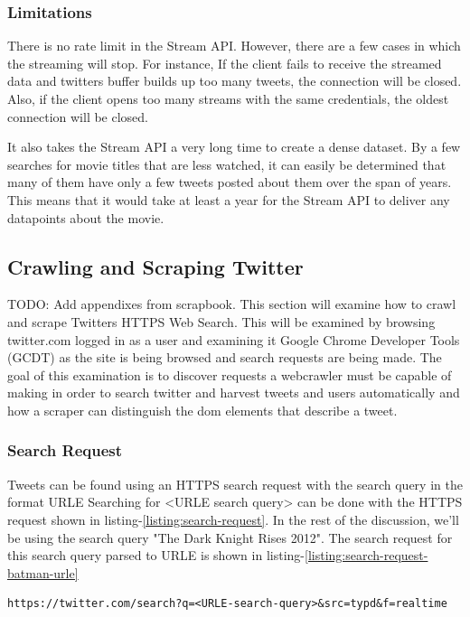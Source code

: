 \subsubsection{Limitations}
There is no rate limit in the Stream API. However, there are a few cases in which the streaming will stop. For instance, If the client fails to receive the streamed data and twitters buffer builds up too many tweets, the connection will be closed. Also, if the client opens too many streams with the same credentials, the oldest connection will be closed.

It also takes the Stream API a very long time to create a dense dataset. By a few searches for movie titles that are less watched, it can easily be determined that many of them have only a few tweets posted about them over the span of years. This means that it would take at least a year for the Stream API to deliver any datapoints about the movie.

\subsection{Crawling and Scraping Twitter}
TODO: Add appendixes from scrapbook.
This section will examine how to crawl and scrape Twitters HTTPS Web Search. This will be examined by browsing twitter.com logged in as a user and examining it Google Chrome Developer Tools (GCDT)\cite{gcdt} as the site is being browsed and search requests are being made. The goal of this examination is to discover requests a webcrawler must be capable of making in order to search twitter and harvest tweets and users automatically and how a scraper can distinguish the dom elements that describe a tweet.


\subsubsection{Search Request}
Tweets can be found using an HTTPS search request with the search query in the format URLE \cite{w3-urle-ref}
Searching for <URLE search query> can be done with the HTTPS request shown in listing-\ref{listing:search-request}.
In the rest of the discussion, we'll be using the search query "The Dark Knight Rises 2012". The search request for this search query parsed to URLE is shown in listing-\ref{listing:search-request-batman-urle}

  \begin{lstlisting}[caption={URL of a twitter HTTPS search request for <URLE-search-query>},label={listing:search-request},captionpos=b]
  https://twitter.com/search?q=<URLE-search-query>&src=typd&f=realtime
  \end{lstlisting}

